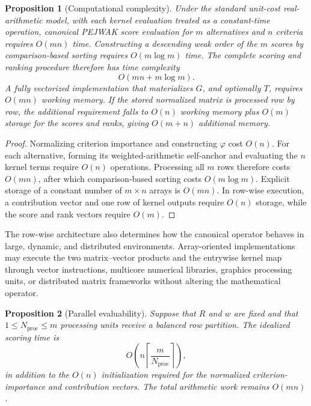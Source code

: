 \documentclass[reqno,11pt]{amsart}
\theoremstyle{definition}
\theoremstyle{plain}
\newtheorem{proposition}{Proposition}
\theoremstyle{remark}
\begin{document}
\begin{proposition}[Computational complexity]
Under the standard unit-cost real-arithmetic model, with each kernel evaluation
treated as a constant-time operation, canonical PEJWAK score evaluation for
\(m\) alternatives and \(n\) criteria requires \(O(mn)\) time. Constructing a
descending weak order of the \(m\) scores by comparison-based sorting requires
\(O(m\log m)\) time. The complete scoring and ranking procedure therefore has
time complexity
\begin{equation}
O(mn+m\log m).
\label{eq:total-complexity}
\end{equation}
A fully vectorized implementation that materializes \(G\), and optionally
\(T\), requires \(O(mn)\) working memory. If the stored normalized matrix is
processed row by row, the additional requirement falls to \(O(n)\) working
memory plus \(O(m)\) storage for the scores and ranks, giving \(O(m+n)\)
additional memory.
\end{proposition}

\begin{proof}
Normalizing criterion importance and constructing \(\varphi\) cost \(O(n)\).
For each alternative, forming its weighted-arithmetic self-anchor and
evaluating the \(n\) kernel terms require \(O(n)\) operations. Processing all
\(m\) rows therefore costs \(O(mn)\), after which comparison-based sorting
costs \(O(m\log m)\). Explicit storage of a constant number of
\(m\times n\) arrays is \(O(mn)\). In row-wise execution, a contribution vector
and one row of kernel outputs require \(O(n)\) storage, while the score and rank
vectors require \(O(m)\).
\end{proof}

The row-wise architecture also determines how the canonical operator behaves
in large, dynamic, and distributed environments. Array-oriented
implementations may execute the two matrix--vector products and the entrywise
kernel map through vector instructions, multicore numerical libraries,
graphics processing units, or distributed matrix frameworks without altering
the mathematical operator.

\begin{proposition}[Parallel evaluability]
Suppose that \(R\) and \(w\) are fixed and that
\(1\leq N_{\mathrm{proc}}\leq m\) processing units receive a balanced row
partition. The idealized scoring time is
\begin{equation}
O\!\left(
n\left\lceil\frac{m}{N_{\mathrm{proc}}}\right\rceil
\right),
\label{eq:parallel-complexity}
\end{equation}
in addition to the \(O(n)\) initialization required for the normalized
criterion-importance and contribution vectors. The total arithmetic work
remains \(O(mn)\).
\end{proposition}
\end{document}
